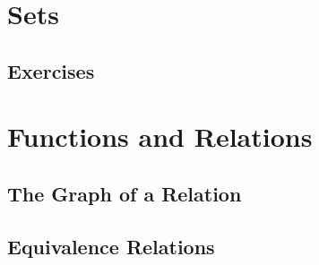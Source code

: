 

\section{Sets}


\subsection{Exercises}


\section{Functions and Relations}


\subsection{The Graph of a Relation}


\subsection{Equivalence Relations}

